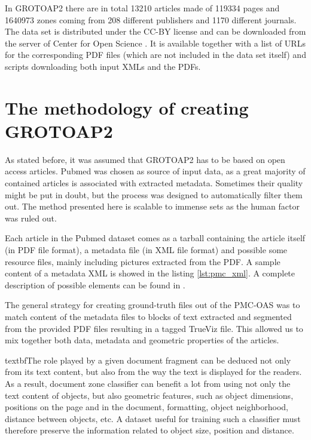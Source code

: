 In GROTOAP2 there are in total 13210 articles made of 119334 pages and 1640973 zones coming from 208 different publishers and 1170 different journals. The data set is distributed under the CC-BY license and can be downloaded from the server of Center for Open Science \cite{CeON}. It is available together with a list of URLs for the corresponding PDF files (which are not included in the data set itself) and scripts downloading both input XMLs and the PDFs.

\section{The methodology of creating GROTOAP2}
As stated before, it was assumed that GROTOAP2 has to be based on open access articles. Pubmed was chosen as source of input data, as a great majority of contained articles is associated with extracted metadata. Sometimes their quality might be put in doubt, but the process was designed to automatically filter them out. The method presented here is scalable to immense sets as the human factor was ruled out.

Each article in the Pubmed dataset comes as a tarball containing the article itself (in PDF file format), a metadata file (in XML file format) and possible some resource files, mainly including pictures extracted from the PDF. A sample content of a metadata XML is showed in the listing \ref{lst:pmc_xml}. A complete description of possible elements can be found in \cite{PubmedXML}.



The general strategy for creating ground-truth files out of the PMC-OAS was to match content of the metadata files to blocks of text extracted and segmented from the provided PDF files resulting in a tagged TrueViz file. This allowed us to mix together both data, metadata and geometric properties of the articles. \

textbf{The role played by a given document fragment can be deduced not only from its text content, but also from the way the text is displayed for the readers. As a result, document zone classifier can benefit a lot from using not only the text content of objects, but also geometric features, such as object dimensions, positions on the page and in the document, formatting, object neighborhood, distance between objects, etc. A dataset useful for training such a classifier must therefore preserve the information related to object size, position and distance.}

